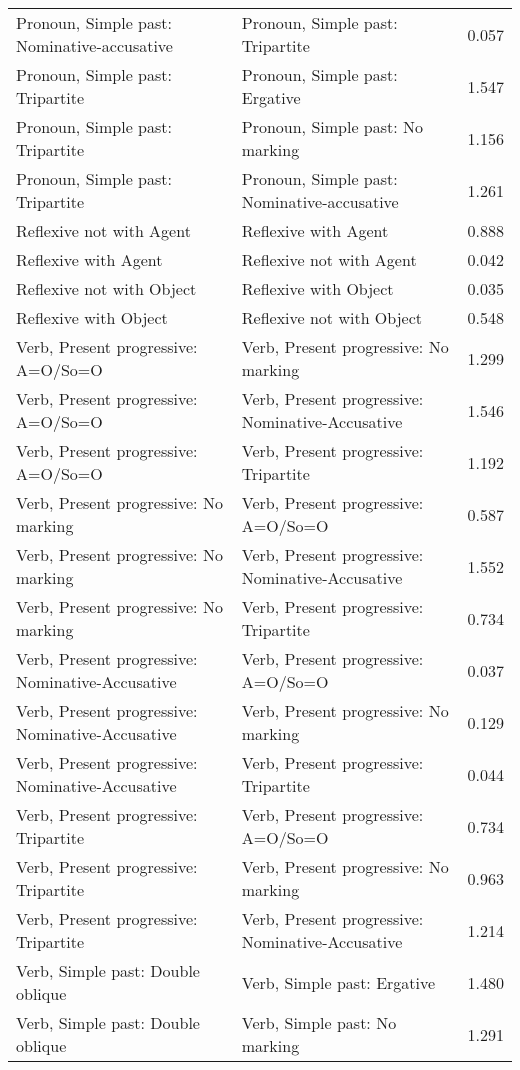 \begin{longtable}{p{.4\linewidth}p{.4\linewidth}p{.1\linewidth}}
Pronoun, Simple past: Nominative-accusative & Pronoun, Simple past: Tripartite & 0.057\\
Pronoun, Simple past: Tripartite & Pronoun, Simple past: Ergative & 1.547\\
Pronoun, Simple past: Tripartite & Pronoun, Simple past: No marking & 1.156\\
Pronoun, Simple past: Tripartite & Pronoun, Simple past: Nominative-accusative & 1.261\\
Reflexive not with Agent & Reflexive with Agent & 0.888\\
Reflexive with Agent & Reflexive not with Agent & 0.042\\
Reflexive not with Object & Reflexive with Object & 0.035\\
Reflexive with Object & Reflexive not with Object & 0.548\\
Verb, Present progressive: A=O/So=O & Verb, Present progressive: No marking & 1.299\\
Verb, Present progressive: A=O/So=O & Verb, Present progressive: Nominative-Accusative & 1.546\\
Verb, Present progressive: A=O/So=O & Verb, Present progressive: Tripartite & 1.192\\
Verb, Present progressive: No marking & Verb, Present progressive: A=O/So=O & 0.587\\
Verb, Present progressive: No marking & Verb, Present progressive: Nominative-Accusative & 1.552\\
Verb, Present progressive: No marking & Verb, Present progressive: Tripartite & 0.734\\
Verb, Present progressive: Nominative-Accusative & Verb, Present progressive: A=O/So=O & 0.037\\
Verb, Present progressive: Nominative-Accusative & Verb, Present progressive: No marking & 0.129\\
Verb, Present progressive: Nominative-Accusative & Verb, Present progressive: Tripartite & 0.044\\
Verb, Present progressive: Tripartite & Verb, Present progressive: A=O/So=O & 0.734\\
Verb, Present progressive: Tripartite & Verb, Present progressive: No marking & 0.963\\
Verb, Present progressive: Tripartite & Verb, Present progressive: Nominative-Accusative & 1.214\\
Verb, Simple past: Double oblique & Verb, Simple past: Ergative & 1.480\\
Verb, Simple past: Double oblique & Verb, Simple past: No marking & 1.291\\

\end{longtable}

